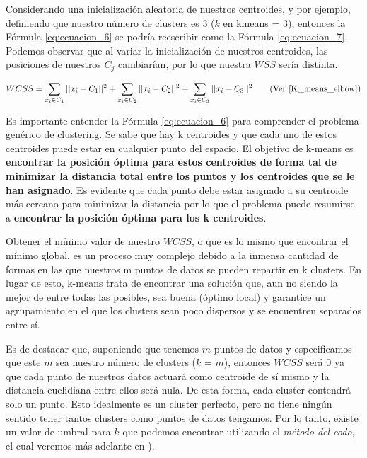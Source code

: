 \documentclass[12pt,a4paper]{article}
\begin{document}
\begin{sloppypar}
Considerando una inicialización aleatoria de nuestros centroides, y por ejemplo, definiendo que nuestro número de clusters es 3 ($k$ en kmeans = 3), entonces la Fórmula \ref{eq:ecuacion_6} se podría reescribir como la Fórmula \ref{eq:ecuacion_7}. Podemos observar que al variar la inicialización de nuestros centroides, las posiciones de nuestros $C_{j}$ cambiarían, por lo que nuestra $WSS$ sería distinta. 

\begin{equation}\label{eq:ecuacion_7}
WCSS =  \sum_{x_{i} \in C_{1}}||x_{i}-C_{1}||^2 + \sum_{x_{i} \in C_{2}}||x_{i}-C_{2}||^2 + \sum_{x_{i} \in C_{3}}||x_{i}-C_{3}||^2     \qquad  \text{(Ver \cite{K_means_elbow})}
\end{equation}

\cleardoublepage
Es importante entender la Fórmula \ref{eq:ecuacion_6} para comprender el problema genérico de clustering. Se sabe que hay k centroides y que cada uno de estos centroides puede estar en cualquier punto del espacio. El objetivo de k-means es \textbf{encontrar la posición óptima para estos centroides de forma tal de minimizar la distancia total entre los puntos y los centroides que se le han asignado}. Es evidente que cada punto debe estar asignado a su centroide más cercano para minimizar la distancia por lo que el problema puede resumirse a \textbf{encontrar la posición óptima para los k centroides}.

Obtener el mínimo valor de nuestro $WCSS$, o que es lo mismo que encontrar el mínimo global, es un proceso muy complejo debido a la inmensa cantidad de formas en las que nuestros m puntos de datos se pueden repartir en k clusters. En lugar de esto, k-means trata de encontrar una solución que, aun no siendo la mejor de entre todas las posibles, sea buena (óptimo local) y garantice un agrupamiento en el que los clusters sean poco dispersos y se encuentren separados entre sí.

Es de destacar que, suponiendo que tenemos $m$ puntos de datos y especificamos que este $m$ sea nuestro número de clusters ($k$ = $m$), entonces $WCSS$ será 0 ya que cada punto de nuestros datos actuará como centroide de sí mismo y la distancia euclidiana entre ellos será nula. De esta forma, cada cluster contendrá solo un punto. Esto idealmente es un cluster perfecto, pero no tiene ningún sentido tener tantos clusters como puntos de datos tengamos. Por lo tanto, existe un valor de umbral para $k$ que podemos encontrar utilizando el \textit{método del codo}, el cual veremos más adelante en \textit{}).


\end{sloppypar}
\end{document}
